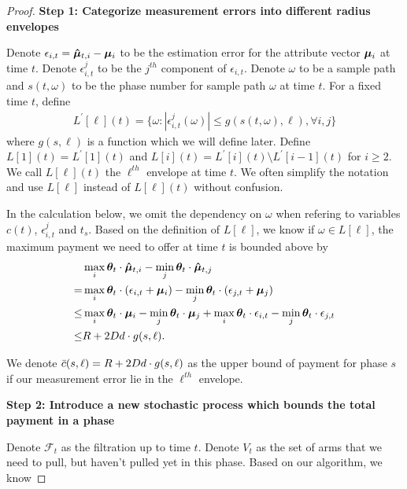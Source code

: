 \begin{proof}

\noindent\textbf{Step 1: Categorize measurement errors into different radius envelopes}


Denote $\epsilon_{i,t}=\bm{\hat{\mu}}_{t,i}-\bm{\mu}_{i}$ to be the estimation error for the attribute vector $\bm{\mu}_{i}$ at time $t$. Denote $\epsilon_{i,t}^{j}$ to be the $j^{th}$ component of $\epsilon_{i,t}$. Denote $\omega$ to be a sample path and $s(t,\omega)$ to be the phase number for sample path $\omega$ at time $t$. For a fixed time $t$, define
\begin{align}
L^{'}[\ell](t) = \{\omega:|\epsilon_{i,t}^{j}(\omega)|\leq g(s(t,\omega),\ell), \forall i,j\}\nonumber
\end{align}
where $g(s,\ell)$ is a function which we will define later. Define $L[1](t) = L^{'}[1](t)$ and $L[i](t) = L^{'}[i](t)\setminus L^{'}[i-1](t)$ for $i\geq 2$. We call $L[\ell](t)$ the $\ell^{th}$ envelope at time $t$. We often simplify the notation and use $L[\ell]$ instead of $L[\ell](t)$ without confusion.

In the calculation below, we omit the dependency on $\omega$ when refering to variables $c(t)$, $\epsilon_{i,t}^{j}$ and $t_s$. Based on the definition of $L[\ell]$, we know if $\omega\in L[\ell]$, the maximum payment we need to offer at time $t$ is bounded above by 
\begin{align}
&\max_{i}\bm{\theta}_{t}\cdot \bm{\hat{\mu}}_{t,i} - \min_{j}\bm{\theta}_{t}\cdot \bm{\hat{\mu}}_{t,j} \nonumber \\
= &\max_{i}\bm{\theta}_{t}\cdot (\epsilon_{i,t}+\bm{\mu}_{i}) - \min_{j}\bm{\theta}_{t}\cdot (\epsilon_{j,t}+\bm{\mu}_{j}) \nonumber \\
\leq &\max_{i}\bm{\theta}_{t}\cdot \bm{\mu}_{i} - \min_{j}\bm{\theta}_{t}\cdot \bm{\mu}_{j} +\max_{i}\bm{\theta}_{t}\cdot \epsilon_{i,t} - \min_{j}\bm{\theta}_{t}\cdot \epsilon_{j,t}\nonumber \\
\leq & R + 2D d\cdot g(s,\ell). \nonumber
\end{align}

We denote $\bar{c}(s,\ell)=R + 2D d\cdot g(s,\ell)$ as the upper bound of payment for phase $s$ if our measurement error lie in the $\ell^{th}$ envelope.


\noindent\textbf{Step 2: Introduce a new stochastic process which bounds the total payment in a phase}

Denote $\mathcal{F}_t$ as the filtration up to time $t$. Denote $V_t$ as the set of arms that we need to pull, but haven't pulled yet in this phase. Based on our algorithm, we know


\end{proof}
